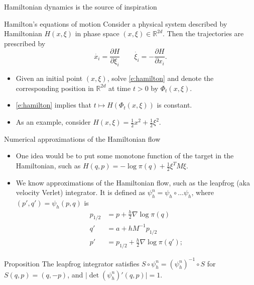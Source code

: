 \documentclass[10pt]{beamer}
\begin{document}
\begin{frame}{Hamiltonian dynamics is the source of inspiration}
\begin{block}{Hamilton's equations of motion}
Consider a physical system described by Hamiltonian $H(x,\xi)$ in phase space $(x,\xi)\in \mathbb{R}^{2d}$. Then the trajectories are prescribed by
\begin{equation}
  \label{e:hamilton}
  \dot{x_i} = \frac{\partial H}{\partial \xi_i} \qquad \dot{\xi_i} = -\frac{\partial H}{\partial x_i}.
\end{equation}
\end{block}
\begin{itemize}
  \item Given an initial point $(x,\xi)$, solve \eqref{e:hamilton} and denote the corresponding position in $\mathbb{R}^{2d}$ at time $t>0$ by $\Phi_t(x,\xi)$.
  \item \eqref{e:hamilton} implies that $t\mapsto H(\Phi_t(x,\xi))$ is constant.
  \item As an example, consider $H(x,\xi) = \frac12 x^2 + \frac12 \xi^2.$
\end{itemize}
\blank
\end{frame}

\begin{frame}{Numerical approximations of the Hamiltonian flow}
\begin{itemize}
  \item One idea would be to put some monotone function of the target in the Hamiltonian, such as $ H(q,p) = -\log \pi(q) + \frac12 \xi^T M \xi $.
  \item We know approximations of the Hamiltonian flow, such as the leapfrog (aka velocity Verlet) integrator. It is defined as $\psi_h^n = \psi_h \circ \dots \psi_h$, where $(p',q') = \psi_h(p,q)$ is 
\begin{align*}
    p_{1/2} &= p + \frac{h}{2}\nabla \log \pi(q)\\
    q' &= a+hM^{-1}p_{1/2}\\
    p' &= p_{1/2} + \frac{h}{2} \nabla \log\pi (q');
\end{align*}
\end{itemize}
\begin{block}{Proposition}
  The leapfrog integrator satisfies $S\circ \psi_h^n = (\psi_h^n)^{-1}\circ S$ for $S(q,p) = (q,-p)$, and $\vert \det (\psi_h^n)'(q,p)\vert = 1$. 
\end{block}
\end{frame}
\end{document}
